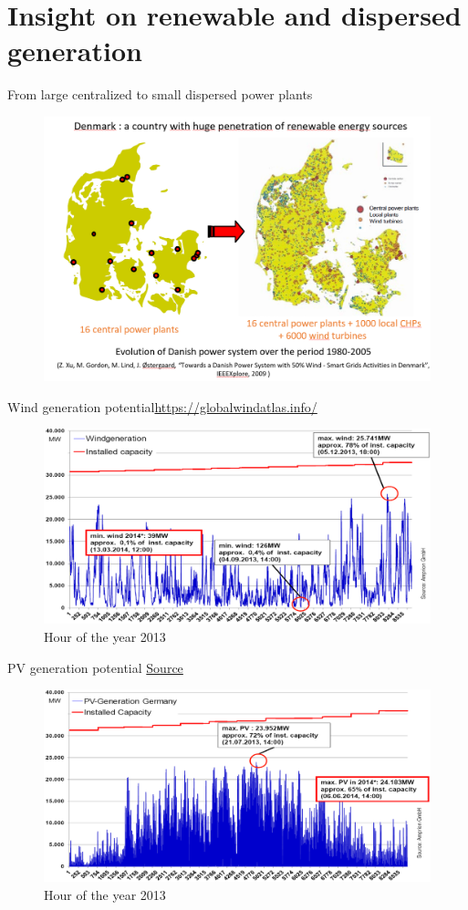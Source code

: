 \section{Insight on renewable and dispersed generation}

\begin{frame}
{From large centralized to small dispersed power plants}
\begin{figure}
\centering
\includegraphics[width=0.6\linewidth]{images/danemark_RES.png}
\end{figure}
\end{frame}

\begin{frame}
{Wind generation potential}\url{https://globalwindatlas.info/}
\begin{figure}
\centering
\includegraphics[width=0.6\linewidth]{images/wind_gen_DE.png}
\caption*{Hour of the year 2013}
\end{figure}
\end{frame}

\begin{frame}{PV generation potential}
\href{https://re.jrc.ec.europa.eu/pvg_download/map_index_c.html}{Source}
\begin{figure}
\centering
\includegraphics[width=0.7\linewidth]{images/PV_gen_DE.png}
\caption*{Hour of the year 2013}
\end{figure}
\end{frame}

